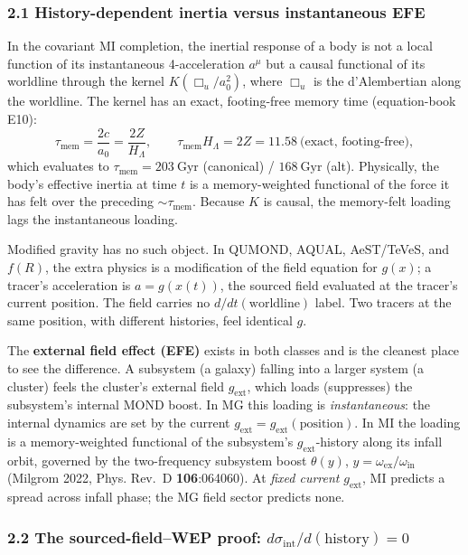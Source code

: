 \documentclass[
]{article}
\newcounter{none} %
\begin{document}
\subsubsection{2.1 History-dependent inertia versus instantaneous
EFE}\label{history-dependent-inertia-versus-instantaneous-efe}

In the covariant MI completion, the inertial response of a body is not a
local function of its instantaneous 4-acceleration \(a^\mu\) but a
causal functional of its worldline through the kernel
\(K(\Box_u/a_0^2)\), where \(\Box_u\) is the d'Alembertian along the
worldline. The kernel has an exact, footing-free memory time
(equation-book E10): \[
\tau_\mathrm{mem} = \frac{2c}{a_0} = \frac{2Z}{H_\Lambda}, \qquad \tau_\mathrm{mem} H_\Lambda = 2Z = 11.58 \ \text{(exact, footing-free)},
\] which evaluates to \(\tau_\mathrm{mem}=203\ \mathrm{Gyr}\) (canonical) /
\(168\ \mathrm{Gyr}\) (alt). Physically, the body's effective inertia at
time \(t\) is a memory-weighted functional of the force it has felt over
the preceding \(\sim\tau_\mathrm{mem}\). Because \(K\) is causal, the
memory-felt loading lags the instantaneous loading.

Modified gravity has no such object. In QUMOND, AQUAL, AeST/TeVeS, and
\(f(R)\), the extra physics is a modification of the field equation for
\(g(x)\); a tracer's acceleration is \(a=g(x(t))\), the sourced field
evaluated at the tracer's current position. The field carries no
\(d/dt(\text{worldline})\) label. Two tracers at the same position, with
different histories, feel identical \(g\).

The \textbf{external field effect (EFE)} exists in both classes and is
the cleanest place to see the difference. A subsystem (a galaxy) falling
into a larger system (a cluster) feels the cluster's external field
\(g_\mathrm{ext}\), which loads (suppresses) the subsystem's internal MOND
boost. In MG this loading is \emph{instantaneous}: the internal dynamics
are set by the current \(g_\mathrm{ext}=g_\mathrm{ext}(\text{position})\). In
MI the loading is a memory-weighted functional of the subsystem's
\(g_\mathrm{ext}\)-history along its infall orbit, governed by the
two-frequency subsystem boost \(\theta(y)\),
\(y=\omega_\mathrm{ex}/\omega_\mathrm{in}\) (Milgrom 2022, Phys. Rev.~D
\textbf{106}:064060). At \emph{fixed current} \(g_\mathrm{ext}\), MI
predicts a spread across infall phase; the MG field sector predicts
none.

\subsubsection{\texorpdfstring{2.2 The sourced-field--WEP proof:
\(d\sigma_\mathrm{int}/d(\text{history})=0\)}{2.2 The sourced-field--WEP proof: d\textbackslash sigma\_\{\textbackslash rm int\}/d(\textbackslash text\{history\})=0}}\label{the-sourced-fieldwep-proof-dsigma_rm-intdtexthistory0}
\end{document}
